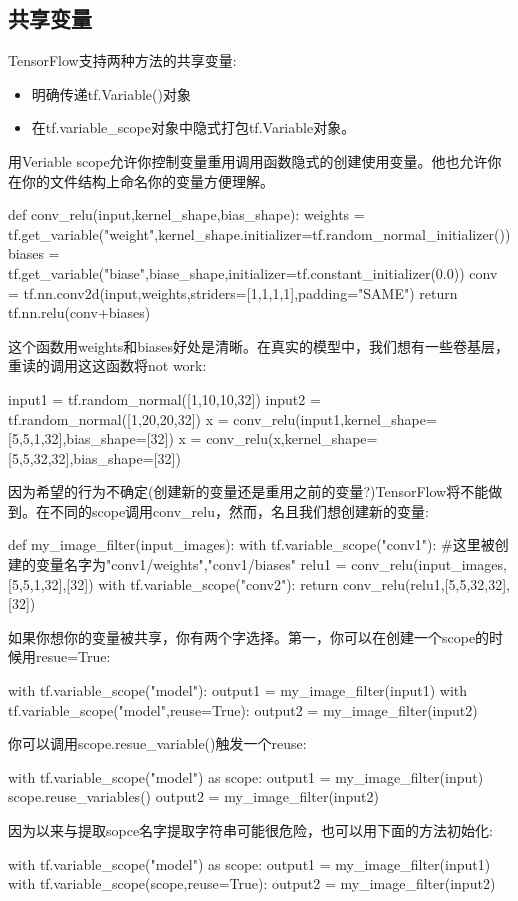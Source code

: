 \subsection{共享变量}
TensorFlow支持两种方法的共享变量:
\begin{itemize}
	\item 明确传递tf.Variable()对象
	\item 在tf.variable\_scope对象中隐式打包tf.Variable对象。
\end{itemize}
用Veriable scope允许你控制变量重用调用函数隐式的创建使用变量。他也允许你在你的文件结构上命名你的变量方便理解。
\begin{python}
def conv_relu(input,kernel_shape,bias_shape):
    weights = tf.get_variable("weight",kernel_shape.initializer=tf.random_normal_initializer())
    biases = tf.get_variable("biase",biase_shape,initializer=tf.constant_initializer(0.0))
    conv = tf.nn.conv2d(input,weights,striders=[1,1,1,1],padding="SAME")
    return tf.nn.relu(conv+biases)
\end{python}
这个函数用weights和biases好处是清晰。在真实的模型中，我们想有一些卷基层，重读的调用这这函数将not work:
\begin{python}
input1 = tf.random_normal([1,10,10,32])
input2 = tf.random_normal([1,20,20,32])
x = conv_relu(input1,kernel_shape=[5,5,1,32],bias_shape=[32])
	x = conv_relu(x,kernel_shape=[5,5,32,32],bias_shape=[32])
\end{python}
因为希望的行为不确定(创建新的变量还是重用之前的变量?)TensorFlow将不能做到。在不同的scope调用conv\_relu，然而，名且我们想创建新的变量:
\begin{python}
def my_image_filter(input_images):
    with tf.variable_scope("conv1"):
    #这里被创建的变量名字为"conv1/weights","conv1/biases"
        relu1 = conv_relu(input_images,[5,5,1,32],[32])
    with tf.variable_scope("conv2"):
	return conv_relu(relu1,[5,5,32,32],[32])
\end{python}
如果你想你的变量被共享，你有两个字选择。第一，你可以在创建一个scope的时候用resue=True:
\begin{python}
with tf.variable_scope("model"):
    output1 = my_image_filter(input1)
with tf.variable_scope("model",reuse=True):
    output2 = my_image_filter(input2)
\end{python}
你可以调用scope.resue\_variable()触发一个reuse:
\begin{python}
with tf.variable_scope("model") as scope:
    output1 = my_image_filter(input)
    scope.reuse_variables()
    output2 = my_image_filter(input2)
\end{python}
因为以来与提取sopce名字提取字符串可能很危险，也可以用下面的方法初始化:
\begin{python}
with tf.variable_scope("model") as scope:
    output1 = my_image_filter(input1)
with tf.variable_scope(scope,reuse=True):
    output2 = my_image_filter(input2)
\end{python}

